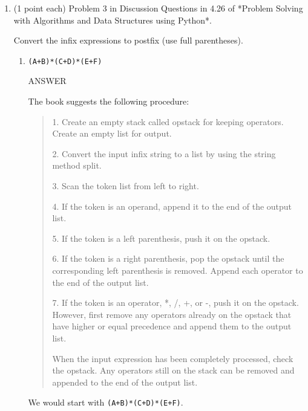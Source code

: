 \documentclass{article} %
\begin{document}
\begin{enumerate}
\begin{enumerate}
      
  \end{enumerate} 

\item (1 point each)
  Problem 3 in Discussion Questions in 4.26 of *Problem Solving with
  Algorithms and Data Structures using Python*. 

  Convert the infix expressions to postfix (use full parentheses).

  \begin{enumerate}\label{in2posta}
  \item
    \verb|(A+B)*(C+D)*(E+F)|

    \begin{minipage}{4.5in}
      \vspace{.1in}
      ANSWER

      The book suggests the following procedure:

      \begin{quotation}
        
        1. Create an empty stack called opstack for keeping
        operators. Create an empty list for output.

        2. Convert the input infix string to a list by using the string
        method split.

        3. Scan the token list from left to right.

        4. If the token is an operand, append it to the end of the output list.

        5. If the token is a left parenthesis, push it on the opstack.

        6. If the token is a right parenthesis, pop the opstack until the
        corresponding left parenthesis is removed. Append each
        operator to the end of the output list.

        7. If the token is an operator, *, /, +, or -, push it on the
        opstack. However, first remove any operators already on the
        opstack that have higher or equal precedence and append them
        to the output list.

        When the input expression has been completely processed, check
        the opstack. Any operators still on the stack can be removed
        and appended to the end of the output list.
      \end{quotation}
    \end{minipage}

    \begin{minipage}{4.5in}
      \vspace{.1in}
      We would start with \verb|(A+B)*(C+D)*(E+F)|.


\end{minipage}
\end{enumerate}
\end{enumerate}
\end{document}
